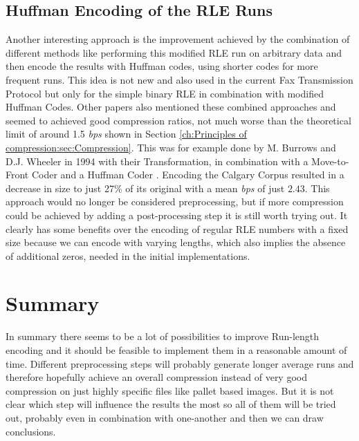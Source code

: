 \subsection{Huffman Encoding of the RLE Runs}
\par{
Another interesting approach is the improvement achieved by the combination of different methods like performing this modified RLE run on arbitrary data and then encode the results with Huffman codes, using shorter codes for more frequent runs. This idea is not new and also used in the current Fax Transmission Protocol but only for the simple binary RLE in combination with modified Huffman Codes. Other papers also mentioned these combined approaches and seemed to achieved good compression ratios, not much worse than the theoretical limit of around 1.5 \textit{bps} shown in Section \ref{ch:Principles of compression:sec:Compression}. This was for example done by M. Burrows and D.J. Wheeler in 1994 with their Transformation, in combination with a Move-to-Front Coder and a Huffman Coder \cite{Burrows94}. Encoding the Calgary Corpus resulted in a decrease in size to just 27\% of its original with a mean \textit{bps} of just $2.43$. This approach would no longer be considered preprocessing, but if more compression could be achieved by adding a post-processing step it is still worth trying out. It clearly has some benefits over the encoding of regular RLE numbers with a fixed size because we can encode with varying lengths, which also implies the absence of additional zeros, needed in the initial implementations.}

\section{Summary}
\label{ch:Analyse:sec:Summary}
In summary there seems to be a lot of possibilities to improve Run-length encoding and it should be feasible to implement them in a reasonable amount of time. Different preprocessing steps will probably generate longer average runs and therefore hopefully achieve an overall compression instead of very good compression on just highly specific files like pallet based images. But it is not clear which step will influence the results the most so all of them will be tried out, probably even in combination with one-another and then we can draw conclusions.

